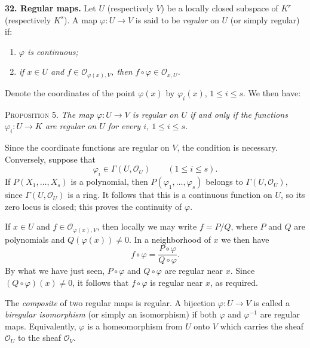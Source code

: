 
\medskip
{}\label{fac:II:1:no:32}
\textbf{32. Regular maps.}
Let $U$ (respectively $V$) be a locally closed subspace of $K^r$ (respectively $K^s$). A map $\varphi:U\to V$ is said to be \textit{regular} on $U$ (or simply regular) if:

\begin{enumerate}[label=(\alph*),leftmargin=2.5em]
\item{}\label{fac:II:1:no:32:def:item:a} \textit{$\varphi$ is continuous;}
\item{}\label{fac:II:1:no:32:def:item:b} \textit{if $x\in U$ and $f\in\mathcal{O}_{\varphi(x),V}$, then $f\circ\varphi\in\mathcal{O}_{x,U}$.}
\end{enumerate}

Denote the coordinates of the point $\varphi(x)$ by $\varphi_i(x)$, $1\leq i\leq s$. We then have:

\label{fac:II:1:no:32:prop:5}
\textsc{Proposition 5.} \textit{The map $\varphi:U\to V$ is regular on $U$ if and only if the functions $\varphi_i:U\to K$ are regular on $U$ for every $i$, $1\leq i\leq s$.}

Since the coordinate functions are regular on $V$, the condition is necessary. Conversely, suppose that
\[
\varphi_i\in\Gamma(U,\mathcal{O}_U)
\qquad(1\leq i\leq s).
\]
If $P(X_1,\ldots,X_s)$ is a polynomial, then $P(\varphi_1,\ldots,\varphi_s)$ belongs to $\Gamma(U,\mathcal{O}_U)$, since $\Gamma(U,\mathcal{O}_U)$ is a ring. It follows that this is a continuous function on $U$, so its zero locus is closed; this proves the continuity of $\varphi$.

If $x\in U$ and $f\in\mathcal{O}_{\varphi(x),V}$, then locally we may write $f=P/Q$, where $P$ and $Q$ are polynomials and $Q(\varphi(x))\neq0$. In a neighborhood of $x$ we then have
\[
f\circ\varphi=\frac{P\circ\varphi}{Q\circ\varphi}.
\]
By what we have just seen, $P\circ\varphi$ and $Q\circ\varphi$ are regular near $x$. Since $(Q\circ\varphi)(x)\neq0$, it follows that $f\circ\varphi$ is regular near $x$, as required.

The \textit{composite} of two regular maps is regular. A bijection $\varphi:U\to V$ is called a \textit{biregular isomorphism} (or simply an isomorphism) if both $\varphi$ and $\varphi^{-1}$ are regular maps. Equivalently, $\varphi$ is a homeomorphism from $U$ onto $V$ which carries the sheaf $\mathcal{O}_U$ to the sheaf $\mathcal{O}_V$.
